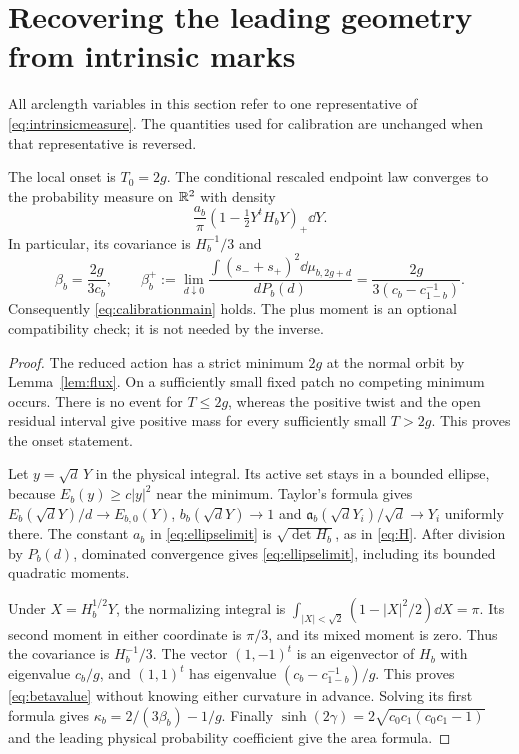 \section{Recovering the leading geometry from intrinsic marks}
\label{sec:calibration}
All arclength variables in this section refer to one representative of
\eqref{eq:intrinsicmeasure}. The quantities used for calibration are
unchanged when that representative is reversed.

\begin{proposition}\label{prop:calibration}
The local onset is $T_0=2g$. The conditional rescaled endpoint law
converges to the probability measure on $\mathbb R^2$ with density
\begin{equation}\label{eq:ellipselimit}
 \frac{a_b}{\pi}(1-\tfrac12Y^tH_bY)_+\dd Y.
\end{equation}
In particular, its covariance is $H_b^{-1}/3$ and
\begin{equation}\label{eq:betavalue}
 \beta_b=\frac{2g}{3c_b},\qquad
 \beta_b^+:=\lim_{d\downarrow0}
 \frac{\int(s_-+s_+)^2\dd\mu_{b,2g+d}}{dP_b(d)}
 =\frac{2g}{3(c_b-c_{1-b}^{-1})}.
\end{equation}
Consequently \eqref{eq:calibrationmain} holds. The plus moment is an
optional compatibility check; it is not needed by the inverse.
\end{proposition}
\begin{proof}
The reduced action has a strict minimum $2g$ at the normal orbit by
Lemma~\ref{lem:flux}. On a sufficiently small fixed patch no competing
minimum occurs. There is no event for $T\le2g$, whereas the positive
twist and the open residual interval give positive mass for every
sufficiently small $T>2g$. This proves the onset statement.

Let $y=\sqrt d\,Y$ in the physical integral. Its active set stays in a
bounded ellipse, because $E_b(y)\ge c|y|^2$ near the minimum. Taylor's
formula gives $E_b(\sqrt dY)/d\to E_{b,0}(Y)$,
$b_b(\sqrt dY)\to1$ and
$\mathfrak a_b(\sqrt dY_i)/\sqrt d\to Y_i$ uniformly there. The constant $a_b$ in
\eqref{eq:ellipselimit} is $\sqrt{\det H_b}$, as in \eqref{eq:H}.
After division by $P_b(d)$, dominated convergence gives
\eqref{eq:ellipselimit}, including its bounded quadratic moments.

Under $X=H_b^{1/2}Y$, the normalizing integral is
$\int_{|X|<\sqrt2}(1-|X|^2/2)\dd X=\pi$.
Its second moment in either coordinate is $\pi/3$, and its mixed
moment is zero. Thus the covariance is $H_b^{-1}/3$.
The vector $(1,-1)^t$ is an eigenvector of $H_b$ with eigenvalue
$c_b/g$, and $(1,1)^t$ has eigenvalue $(c_b-c_{1-b}^{-1})/g$.
This proves \eqref{eq:betavalue} without knowing either curvature in
advance. Solving its first formula gives
$\kappa_b=2/(3\beta_b)-1/g$. Finally
$\sinh(2\gamma)=2\sqrt{c_0c_1(c_0c_1-1)}$ and the leading physical
probability coefficient give the area formula.
\end{proof}

